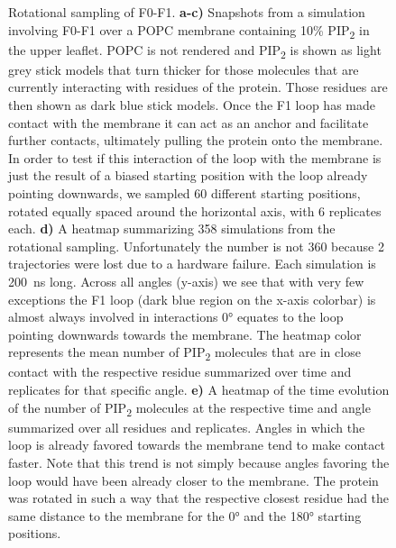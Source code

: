 \documentclass[
  letterpaper,
  DIV=11,
  numbers=noendperiod]{scrartcl}
\begin{document}
\begin{figure}
\begin{minipage}[t]{0.50\linewidth}
{{}

}

\subcaption{\label{fig-f0f1-retention}~}
\end{minipage}%

\caption{\label{fig-loop-importance}Rotational sampling of F0-F1.
\textbf{a-c)} Snapshots from a simulation involving F0-F1 over a POPC
membrane containing 10\% PIP\textsubscript{2} in the upper leaflet. POPC
is not rendered and PIP\textsubscript{2} is shown as light grey stick
models that turn thicker for those molecules that are currently
interacting with residues of the protein. Those residues are then shown
as dark blue stick models. Once the F1 loop has made contact with the
membrane it can act as an anchor and facilitate further contacts,
ultimately pulling the protein onto the membrane. In order to test if
this interaction of the loop with the membrane is just the result of a
biased starting position with the loop already pointing downwards, we
sampled 60 different starting positions, rotated equally spaced around
the horizontal axis, with 6 replicates each. \textbf{d)} A heatmap
summarizing 358 simulations from the rotational sampling. Unfortunately
the number is not 360 because 2 trajectories were lost due to a hardware
failure. Each simulation is 200~ns long. Across all angles (y-axis) we
see that with very few exceptions the F1 loop (dark blue region on the
x-axis colorbar) is almost always involved in interactions 0° equates to
the loop pointing downwards towards the membrane. The heatmap color
represents the mean number of PIP\textsubscript{2} molecules that are in
close contact with the respective residue summarized over time and
replicates for that specific angle. \textbf{e)} A heatmap of the time
evolution of the number of PIP\textsubscript{2} molecules at the
respective time and angle summarized over all residues and replicates.
Angles in which the loop is already favored towards the membrane tend to
make contact faster. Note that this trend is not simply because angles
favoring the loop would have been already closer to the membrane. The
protein was rotated in such a way that the respective closest residue
had the same distance to the membrane for the 0° and the 180° starting
positions.}

\end{figure}
\end{document}
